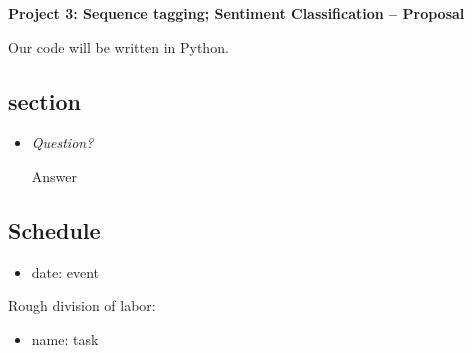 \documentclass{article}
\begin{document}
\begin{center}\textbf{Project 3: Sequence tagging; Sentiment Classification -- Proposal}\end{center}

Our code will be written in Python.

\subsection*{section}

\begin{itemize}
\item \textit{Question?}\par

Answer

\end{itemize}

\subsection*{Schedule}

\begin{itemize}[noitemsep,nolistsep]
\item date: event
\end{itemize}

Rough division of labor:
\begin{itemize}[noitemsep,nolistsep]
\item name: task
\end{itemize}
\end{document}
